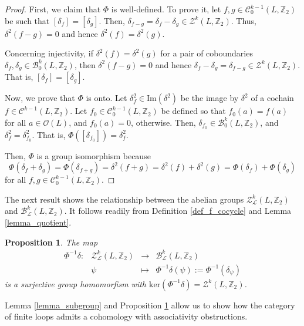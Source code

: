 \documentclass[11pt,a4paper]{article}
\newtheorem{proposition}[theorem]{Proposition}
\begin{document}
\begin{proof} First, we claim that $\Phi$ is well-defined. To prove it, let $f,g\in \mathcal{C}_0^{k-1}(L,\mathbb{Z}_2)$ be such that $[\delta_f]=[\delta_g]$. Then, $\delta_{f-g}=\delta_f-\delta_g\in \mathcal{Z}^k(L,\mathbb{Z}_2)$. Thus, $\delta^2(f-g)=0$ and hence $\delta^2(f)=\delta^2(g)$.

Concerning injectivity, if
$\delta^2(f)=\delta^2(g)$ for a pair of coboundaries $\delta_f,\delta_g\in \mathcal{B}_0^k(L,\mathbb{Z}_2)$, then $\delta^2(f-g)=0$ and hence $\delta_f-\delta_g=\delta_{f-g}\in \mathcal{Z}^k(L,\mathbb{Z}_2)$. That is, $[\delta_f]=[\delta_g]$.

Now, we prove that $\Phi$ is onto. Let $\delta^2_f\in \mathrm{Im}(\delta^2)$ be the image by $\delta^2$ of a cochain $f\in\mathcal{C}^{k-1}(L,\mathbb{Z}_2)$. Let $f_0\in\mathcal{C}_0^{k-1}(L,\mathbb{Z}_2)$ be defined so that $f_0(a)=f(a)$ for all $a\in\mathcal{O}(L)$, and $f_0(a)=0$, otherwise. Then, $\delta_{f_0}\in \mathcal{B}_0^k(L,\mathbb{Z}_2)$, and $\delta^2_f=\delta^2_{f_0}$. That is, $\Phi([\delta_{f_0}])=\delta^2_f$.

Then, $\Phi$ is a group isomorphism because
\[\Phi(\delta_f+\delta_g)=\Phi(\delta_{f+g})=\delta^2(f+g)=\delta^2(f)+\delta^2(g)=\Phi(\delta_f)+\Phi(\delta_g)\]
for all $f,g\in \mathcal{C}_0^{k-1}(L,\mathbb{Z}_2)$.
\end{proof}

The next result shows the relationship between the abelian groups $\mathcal{Z}_{\mathcal{L}}^k(L,\mathbb{Z}_2)$ and $\mathcal{B}_{\mathcal{L}}^k(L,\mathbb{Z}_2)$. It follows readily from Definition \ref{def_f_cocycle} and Lemma \ref{lemma_quotient}.

\begin{proposition}\label{proposition_f_cocycle} The map
\[\begin{array}{cccc}
\Phi^{-1}\delta: & \mathcal{Z}_{\mathcal{L}}^k(L,\mathbb{Z}_2) & \to & \mathcal{B}_{\mathcal{L}}^k(L,\mathbb{Z}_2)\\
& \psi &\mapsto & \Phi^{-1}\delta(\psi):=\Phi^{-1}(\delta_\psi)
\end{array}\]
is a surjective group homomorfism with $\mathrm{ker}(\Phi^{-1}\delta)=\mathcal{Z}^k(L,\mathbb{Z}_2)$.
\end{proposition}

Lemma \ref{lemma_subgroup} and Proposition \ref{proposition_f_cocycle} allow us to show how the category of finite loops admits a cohomology with associativity obstructions.
\end{document}
